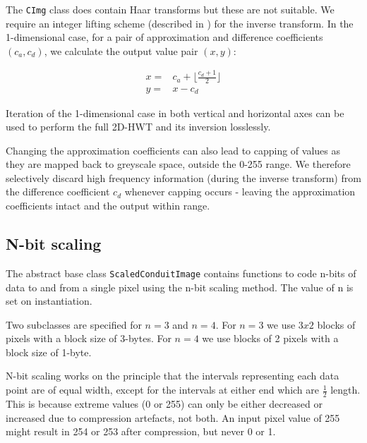 The {\tt CImg} class does contain Haar transforms but these are not suitable. We require an integer lifting scheme (described in \cite{haar}) for the inverse transform. In the 1-dimensional case, for a pair of approximation and difference coefficients $(c_a,c_d)$, we calculate the output value pair $(x,y)$: 

\begin{eqnarray}
    x = & c_a + \lfloor \frac{c_d+1}{2} \rfloor \nonumber \\ 
    y = & x - c_d
\end{eqnarray}

Iteration of the 1-dimensional case in both vertical and horizontal axes can be used to perform the full 2D-HWT and its inversion losslessly.

Changing the approximation coefficients can also lead to capping of values as they are mapped back to greyscale space, outside the 0-255 range. We therefore selectively discard high frequency information (during the inverse transform) from the difference coefficient $c_d$ whenever capping occurs - leaving the approximation coefficients intact and the output within range.



\FloatBarrier
\subsection{N-bit scaling}

The abstract base class {\tt ScaledConduitImage} contains functions to code n-bits of data to and from a single pixel using the n-bit scaling method. The value of n is set on instantiation.

Two subclasses are specified for $n=3$ and $n=4$. For $n=3$ we use $3x2$ blocks of pixels with a block size of 3-bytes. For $n=4$ we use blocks of 2 pixels with a block size of 1-byte.

N-bit scaling works on the principle that the intervals representing each data point are of equal width, except for the intervals at either end which are $\frac{1}{2}$ length. This is because extreme values (0 or 255) can only be either decreased or increased due to compression artefacts, not both. An input pixel value of 255 might result in 254 or 253 after compression, but never 0 or 1.

